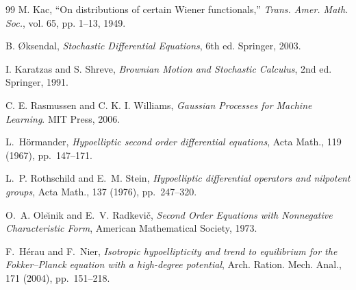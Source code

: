 \documentclass[11pt,a4paper]{article}
\begin{document}
\begin{thebibliography}{99}
M. Kac, ``On distributions of certain Wiener functionals,'' \textit{Trans. Amer. Math. Soc.}, vol. 65, pp. 1--13, 1949.

B. {\O}ksendal, \textit{Stochastic Differential Equations}, 6th ed. Springer, 2003.

I. Karatzas and S. Shreve, \textit{Brownian Motion and Stochastic Calculus}, 2nd ed. Springer, 1991.

C. E. Rasmussen and C. K. I. Williams, \textit{Gaussian Processes for Machine Learning}. MIT Press, 2006.

L.~H\"{o}rmander, \emph{Hypoelliptic second order differential equations}, Acta Math., 119 (1967), pp.~147--171.

L.~P. Rothschild and E.~M. Stein, \emph{Hypoelliptic differential operators and nilpotent groups}, Acta Math., 137 (1976), pp.~247--320.

O.~A. Ole\u{\i}nik and E.~V. Radkevi\v{c}, \emph{Second Order Equations with Nonnegative Characteristic Form}, American Mathematical Society, 1973.

F.~H\'{e}rau and F.~Nier, \emph{Isotropic hypoellipticity and trend to equilibrium for the Fokker--Planck equation with a high-degree potential}, Arch. Ration. Mech. Anal., 171 (2004), pp.~151--218.


\end{thebibliography}

\end{document}
